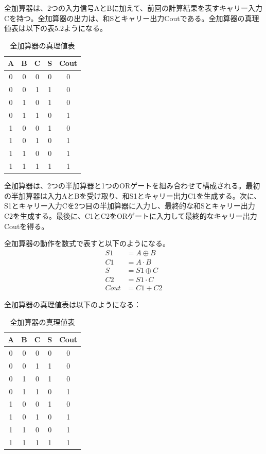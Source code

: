 \documentclass{jlreq}
\numberwithin{equation}{section}
\begin{document}
全加算器は、2つの入力信号AとBに加えて、前回の計算結果を表すキャリー入力Cを持つ。全加算器の出力は、和Sとキャリー出力Coutである。全加算器の真理値表は以下の表5.2ようになる。
\begin{table}[H]
  \centering
  \caption{全加算器の真理値表}
  \begin{tabular}{|c|c|c|c|c|}
    \hline
    A & B & C & S & Cout \\ \hline
    0 & 0 & 0 & 0 & 0 \\ \hline
    0 & 0 & 1 & 1 & 0 \\ \hline
    0 & 1 & 0 & 1 & 0 \\ \hline
    0 & 1 & 1 & 0 & 1 \\ \hline
    1 & 0 & 0 & 1 & 0 \\ \hline
    1 & 0 & 1 & 0 & 1 \\ \hline
    1 & 1 & 0 & 0 & 1 \\ \hline
    1 & 1 & 1 & 1 & 1 \\ \hline
  \end{tabular}
\end{table}

全加算器は、2つの半加算器と1つのORゲートを組み合わせて構成される。最初の半加算器は入力AとBを受け取り、和S1とキャリー出力C1を生成する。次に、S1とキャリー入力Cを2つ目の半加算器に入力し、最終的な和Sとキャリー出力C2を生成する。最後に、C1とC2をORゲートに入力して最終的なキャリー出力Coutを得る。

全加算器の動作を数式で表すと以下のようになる。
\begin{align}
  S1 &= A \oplus B \\
  C1 &= A \cdot B \\
  S &= S1 \oplus C \\
  C2 &= S1 \cdot C \\
  Cout &= C1 + C2
\end{align}

全加算器の真理値表は以下のようになる：
\begin{table}[H]
  \centering
  \caption{全加算器の真理値表}
  \begin{tabular}{|c|c|c|c|c|}
    \hline
    A & B & C & S & Cout \\ \hline
    0 & 0 & 0 & 0 & 0 \\ \hline
    0 & 0 & 1 & 1 & 0 \\ \hline
    0 & 1 & 0 & 1 & 0 \\ \hline
    0 & 1 & 1 & 0 & 1 \\ \hline
    1 & 0 & 0 & 1 & 0 \\ \hline
    1 & 0 & 1 & 0 & 1 \\ \hline
    1 & 1 & 0 & 0 & 1 \\ \hline
    1 & 1 & 1 & 1 & 1 \\ \hline
  \end{tabular}
\end{table}
\end{document}
